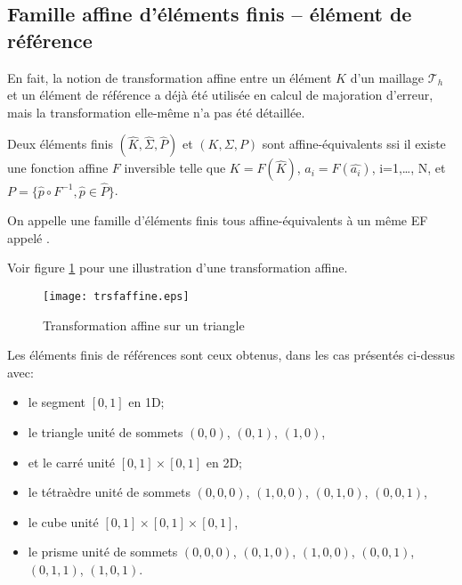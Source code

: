 \medskip
\subsection{Famille affine d'éléments finis -- élément de référence}

En fait, la notion de transformation affine entre un élément $K$ d'un maillage
$\mathcal{T}_h$ et un élément de référence a déjà été utilisée en
calcul de majoration d'erreur, mais la transformation elle-même n'a pas été
détaillée.

\medskip{}
Deux éléments finis $(\hat{K}, \hat{\Sigma}, \hat{P})$ et $(K, \Sigma, P)$ sont
affine-équivalents ssi il existe une fonction affine $F$ inversible telle que
$K=F(\hat{K})$, $a_i=F(\hat{a_i})$, i=1,\ldots, N, et $P=\{\hat{p}\circ F^{-1}, \hat{p}\in\hat{P}\}$.
\normalsize

\medskip
\begin{definition}
On appelle  une famille d'éléments finis
tous affine-équivalents à un même EF appelé .
\end{definition}

\medskip
{}
Voir figure \ref{trsfaffine} pour une illustration d'une transformation affine.
\begin{figure}[ht]
\centering
\texttt{[image: trsfaffine.eps]}
\caption{\label{trsfaffine} Transformation affine sur un triangle}
\end{figure}

\medskip
Les éléments finis de références sont ceux obtenus, dans les cas présentés ci-dessus avec:
\begin{itemize}
\item le segment $[0,1]$ en 1D;
\item le triangle unité de sommets $(0,0)$, $(0,1)$, $(1,0)$,
\item et le carré unité $[0,1]\times[0,1]$ en 2D;
\item le tétraèdre unité de sommets $(0,0,0)$, $(1,0,0)$, $(0,1,0)$, $(0,0,1)$,
\item le cube unité $[0,1]\times[0,1]\times[0,1]$,
\item le prisme unité de sommets $(0,0,0)$, $(0,1,0)$, $(1,0,0)$, $(0,0,1)$, $(0,1,1)$, $(1,0,1)$.
\end{itemize}



